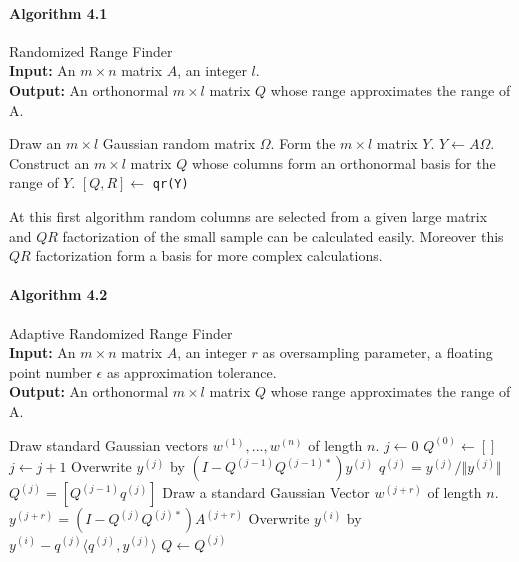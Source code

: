 \documentclass[11pt,a4paper]{article}
\theoremstyle{definition}
\begin{document}
	\paragraph{Algorithm 4.1} 	Randomized Range Finder\\	
	\textbf{Input:} An $m \times n$ matrix $A$, an integer $l$. \\	
	\textbf{Output:} An orthonormal $m \times l$ matrix $Q$ whose range approximates the range of A.
	\begin{algorithmic}[1]
		\State Draw an $m \times l$ Gaussian random matrix $ \Omega$.
		\State Form the $m \times l$ matrix $Y$. $Y \gets	 A \Omega $.
		\State Construct an $m \times l$ matrix $Q$ whose columns form an orthonormal basis for the range of $Y$. $[Q, R] \gets$ \texttt{qr(Y)}
	\end{algorithmic}

	At this first algorithm random columns are selected from a given large matrix and $QR$ factorization of the small sample can be calculated easily. Moreover this $QR$ factorization form a basis for more complex calculations.

	\paragraph{Algorithm 4.2} Adaptive Randomized Range Finder	\\
	\textbf{Input:} An $m \times n$ matrix $A$, an integer $r$ as oversampling parameter, a floating point number $\epsilon$ as approximation tolerance. \\	
	\textbf{Output:} An orthonormal $m \times l$ matrix $Q$ whose range approximates the range of A.
	\begin{algorithmic}[1]
		\State Draw standard Gaussian vectors $w^{(1)}, ... , w^{(n)}$ of length $n$.
		 
		\EndFor
		\State $j \gets 0$
		\State $Q^{(0)} \gets []$ 
			\State $j \gets j+1$
			\State Overwrite $y^{(j)}$ by $(I-Q^{(j-1)}Q^{(j-1)*})y^{(j)}$ 
			\State $q^{(j)} = y^{(j)} / \Vert y^{(j)} \Vert$
			\State $Q^{(j)} = [Q^{(j-1)}q^{(j)}]$
			\State Draw a standard Gaussian Vector $w^{(j+r)}$ of length $n$.
			\State $y^{(j+r)} = (I-Q^{(j)} Q^{(j)*})A^{(j+r)}$
				\State Overwrite $y^{(i)}$ by $y^{(i)} - q^{(j)} \langle q^{(j)}, y^{(j)} \rangle $
			\EndFor
		\EndWhile
		\State $Q \gets Q^{(j)}$
	\end{algorithmic}
	
\end{document}
